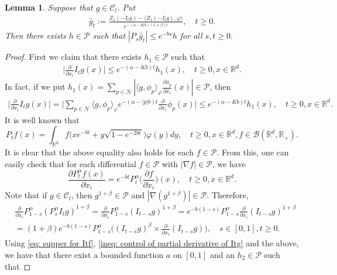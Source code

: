 \documentclass[12pt,a4paper]{amsart}
\theoremstyle{plain}
\newtheorem{lem}[thm]{Lemma}
\theoremstyle{definition}
\numberwithin{equation}{section}
\begin{document}
\begin{lem}
  \label{control of gn} 
  Suppose that $g\in \mathcal{C}_l$.
  Put
  \begin{align}
    \bar{g}_t
    :=\frac{Z_1(-I_tg)-\langle Z_1(-I_tg),\varphi\rangle}{e^{-(\alpha-Kb)(1+\beta)t}},\quad t\geq 0.
  \end{align}
  Then there exists $h\in \mathcal{P}$ such that $|P_s\bar{g}_t| \leq e^{-bs}h$ for all $s, t\geq 0.$
\end{lem}
\begin{proof}
  First we claim that there exists $h_1\in \mathcal P$ such that
\begin{align}
  \label{ineq: control of partial derivative of Itg}
  \Big|\frac{\partial}{\partial x_i}I_tg(x)\Big| \leq e^{-(\alpha-Kb)t}h_1(x),
  \quad  t\geq 0, x\in \mathbb R^d.
\end{align}
In fact, if we put $h_1(x)=\sum_{p\in \mathcal N}|\langle g, \phi_p\rangle_\varphi\frac{\partial \phi_p}{\partial x_i}(x)| \in \mathcal P$, then
\begin{align}
  \Big|\frac{\partial}{\partial x_i}I_tg(x)\Big| =
  \Big|\sum_{p\in \mathcal N}\langle g, \phi_p\rangle_\varphi e^{-(\alpha-|p|b)t} \frac{\partial}{\partial x_i}\phi_p(x)\Big|
  \leq e^{-(\alpha-Kb)t}h_1(x)
  , \quad t\geq 0, x\in \mathbb R^d.
\end{align}
It is well known that
\[
  P_t f(x) = \int_{\mathbb R^d} f\big(x e^{-bt} + y \sqrt{1-e^{-2bt}}\big) \varphi(y) dy,
  \quad t\geq 0, x\in \mathbb R^d, f\in \mathcal B(\mathbb R^d, \mathbb R_+).
\]
It is clear that the above equality also holds for each $f\in \mathcal P$.
From this, one can easily check that for each differential $f \in \mathcal P$ with $|\nabla  f| \in \mathcal P$, we have
\[
  \frac{\partial P_t^\alpha f(x)}{\partial x_i} = e^{-bt} P_t^\alpha\Big(\frac{\partial f}{\partial x_i}\Big)(x), \quad t\geq 0, x\in \mathbb R^d.
\]
Note that if $g \in \mathcal C_l$, then $g^{1+\beta}\in \mathcal P$ and $|\nabla (g^{1+\beta})| \in \mathcal P$.
Therefore,
\begin{align}
  & \frac{\partial}{\partial x_i} P_{1-s}^\alpha  (P_s^\alpha I_t g)^{1+\beta}
    = \frac{\partial}{\partial x_i} P_{1-s}^\alpha (I_{t-s} g)^{1+\beta}
    = e^{-b(1-s)} P_{1-s}^\alpha \frac{\partial}{\partial x_i} (I_{t-s}g)^{1+\beta} \\
  & =(1+\beta)e^{-b(1-s)} P_{1-s}^\alpha \Big( (I_{t-s}g)^\beta \times \frac{\partial}{\partial x_i} (I_{t-s}g) \Big),\quad s\in [0,1], t\geq 0.
\end{align}
Using \eqref{eq: supper for Itf}, \eqref{ineq: control of partial derivative of Itg} and the above, we have that there exist a bounded function $a$ on $[0,1]$ and an $h_2 \in \mathcal P$ such that

\end{proof}
\end{document}
